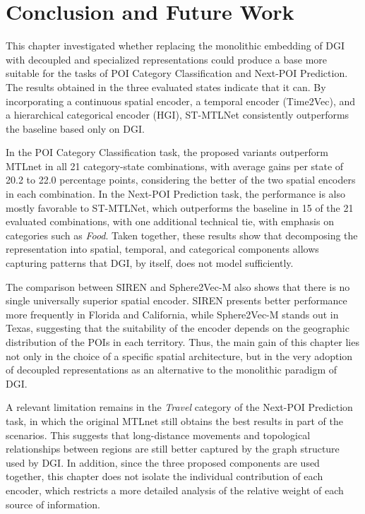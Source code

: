 \section{Conclusion and Future Work}
\label{sec:courb:conclusion}

This chapter investigated whether replacing the monolithic embedding of DGI with decoupled and specialized representations could produce a base more suitable for the tasks of POI Category Classification and Next-POI Prediction. The results obtained in the three evaluated states indicate that it can. By incorporating a continuous spatial encoder, a temporal encoder (Time2Vec), and a hierarchical categorical encoder (HGI), ST-MTLNet consistently outperforms the baseline based only on DGI.

In the POI Category Classification task, the proposed variants outperform MTLnet in all 21 category-state combinations, with average gains per state of 20.2 to 22.0 percentage points, considering the better of the two spatial encoders in each combination. In the Next-POI Prediction task, the performance is also mostly favorable to ST-MTLNet, which outperforms the baseline in 15 of the 21 evaluated combinations, with one additional technical tie, with emphasis on categories such as \textit{Food}. Taken together, these results show that decomposing the representation into spatial, temporal, and categorical components allows capturing patterns that DGI, by itself, does not model sufficiently.

The comparison between SIREN and Sphere2Vec-M also shows that there is no single universally superior spatial encoder. SIREN presents better performance more frequently in Florida and California, while Sphere2Vec-M stands out in Texas, suggesting that the suitability of the encoder depends on the geographic distribution of the POIs in each territory. Thus, the main gain of this chapter lies not only in the choice of a specific spatial architecture, but in the very adoption of decoupled representations as an alternative to the monolithic paradigm of DGI.

A relevant limitation remains in the \textit{Travel} category of the Next-POI Prediction task, in which the original MTLnet still obtains the best results in part of the scenarios. This suggests that long-distance movements and topological relationships between regions are still better captured by the graph structure used by DGI. In addition, since the three proposed components are used together, this chapter does not isolate the individual contribution of each encoder, which restricts a more detailed analysis of the relative weight of each source of information.

